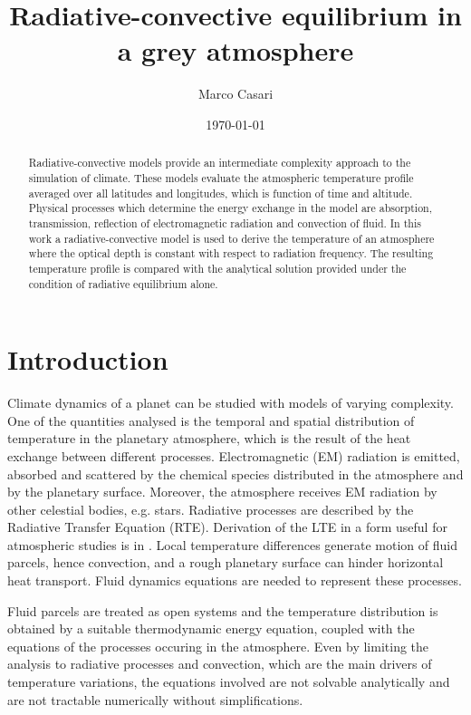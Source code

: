 \documentclass[a4paper,10pt,twocolumn,\classoptions]{article}
\begin{document}
\title{Radiative-convective equilibrium in a grey atmosphere}
\author{Marco Casari}
\date{\today}
\maketitle

\begin{abstract}
  Radiative-convective models provide an intermediate complexity approach to the simulation of climate. These models evaluate the atmospheric temperature profile averaged over all latitudes and longitudes, which is function of time and altitude.
  Physical processes which determine the energy exchange in the model are absorption, transmission, reflection of electromagnetic radiation and convection of fluid.
  In this work a radiative-convective model is used to derive the temperature of an atmosphere where the optical depth is constant with respect to radiation frequency. The resulting temperature profile is compared with the analytical solution provided under the condition of radiative equilibrium alone.
\end{abstract}

\section{Introduction}
\label{sec:Introduction}
Climate dynamics of a planet can be studied with models of varying complexity. One of the quantities analysed is the temporal and spatial distribution of temperature in the planetary atmosphere, which is the result of the heat exchange between different processes. Electromagnetic (EM) radiation is emitted, absorbed and scattered by the chemical species distributed in the atmosphere and by the planetary surface. Moreover, the atmosphere receives EM radiation by other celestial bodies, e.g. stars. Radiative processes are described by the Radiative Transfer Equation (RTE). Derivation of the LTE in a form useful for atmospheric studies is in \cite[25]{Modest}.
Local temperature differences generate motion of fluid parcels, hence convection, and a rough planetary surface can hinder horizontal heat transport. Fluid dynamics equations are needed to represent these processes.

Fluid parcels are treated as open systems and the temperature distribution is obtained by a suitable thermodynamic energy equation, coupled with the equations of the processes occuring in the atmosphere. Even by limiting the analysis to radiative processes and convection, which are the main drivers of temperature variations, the equations involved are not solvable analytically and are not tractable numerically without simplifications.
\end{document}
